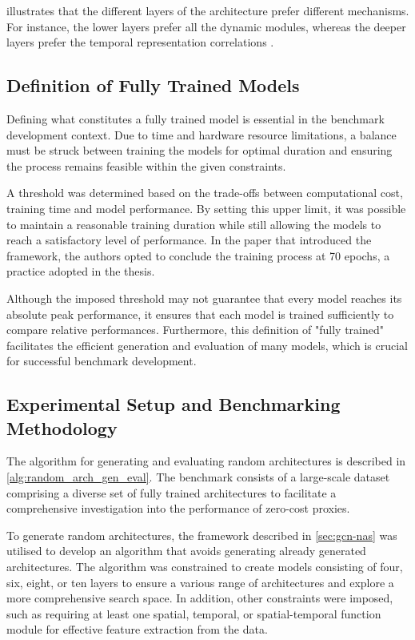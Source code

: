  illustrates that the different layers of the architecture prefer different mechanisms. For instance, the lower layers prefer all the dynamic modules, whereas the deeper layers prefer the temporal representation correlations \autocite{peng2020learning}. 

\subsection{Definition of Fully Trained Models}\label{sec:full_trained}

Defining what constitutes a fully trained model is essential in the benchmark development context. Due to time and hardware resource limitations, a balance must be struck between training the models for optimal duration and ensuring the process remains feasible within the given constraints. 

A threshold was determined based on the trade-offs between computational cost, training time and model performance. By setting this upper limit, it was possible to maintain a reasonable training duration while still allowing the models to reach a  satisfactory level of performance. In the paper that introduced the framework, the authors \autocite{peng2020learning} opted to conclude the training process at 70 epochs, a practice adopted in the thesis.

Although the imposed threshold may not guarantee that every model reaches its absolute peak performance, it ensures that each model is trained sufficiently to compare relative performances. Furthermore, this definition of "fully trained" facilitates the efficient generation and evaluation of many models, which is crucial for successful benchmark development.




\subsection{Experimental Setup and Benchmarking Methodology}\label{subsec:experimentalsetup}

The algorithm for generating and evaluating random architectures is described in \cref{alg:random_arch_gen_eval}. The benchmark consists of a large-scale dataset comprising a diverse set of fully trained architectures to facilitate a comprehensive investigation into the performance of zero-cost proxies.

To generate random architectures, the framework described in \cref{sec:gcn-nas} was utilised to develop an algorithm that avoids generating already generated architectures. The algorithm was constrained to create models consisting of four, six, eight, or ten layers to ensure a various range of architectures and explore a more comprehensive search space. In addition, other constraints were imposed, such as requiring at least one spatial, temporal, or spatial-temporal function module for effective feature extraction from the data.

